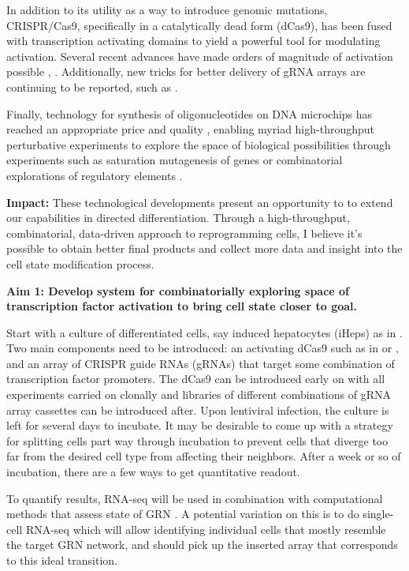 \documentclass[10pt]{article}
\begin{document}
In addition to its utility as a way to introduce genomic mutations, CRISPR/Cas9, specifically in a catalytically dead form (dCas9), has been fused with transcription activating domains to yield a powerful tool for modulating activation. Several recent advances have made orders of magnitude of activation possible \cite{chavez2015VPR}, \cite{konermann2014genome}. Additionally, new tricks for better delivery of gRNA arrays are continuing to be reported, such as \cite{xie2015boosting}.

Finally, technology for synthesis of oligonucleotides on DNA microchips has reached an appropriate price and quality \cite{leproust2010synthesis}, enabling myriad high-throughput perturbative experiments to explore the space of biological possibilities through experiments such as saturation mutagenesis of genes \cite{findlay2014saturation} or combinatorial explorations of regulatory elements \cite{kosuri2013composability}.
\newline

\textbf{Impact:} These technological developments present an opportunity to to extend our capabilities in directed differentiation. Through a high-throughput, combinatorial, data-driven approach to reprogramming cells, I believe it's possible to obtain better final products and collect more data and insight into the cell state modification process.
\newline

\textbf{Aim 1: Develop system for combinatorially exploring space of transcription factor activation to bring cell state closer to goal.}

Start with a culture of differentiated cells, say induced hepatocytes (iHeps) as in \cite{morris2014dissecting}. Two main components need to be introduced: an activating dCas9 such as in \cite{chavez2015VPR} or \cite{konermann2014genome}, and an array of CRISPR guide RNAs (gRNAs) that target some combination of transcription factor promoters. The dCas9 can be introduced early on with all experiments carried on clonally and libraries of different combinations of gRNA array cassettes can be introduced after. Upon lentiviral infection, the culture is left for several days to incubate. It may be desirable to come up with a strategy for splitting cells part way through incubation to prevent cells that diverge too far from the desired cell type from affecting their neighbors. After a week or so of incubation, there are a few ways to get quantitative readout.

To quantify results, RNA-seq will be used in combination with computational methods that assess state of GRN \cite{cahan2014cellnet}. A potential variation on this is to do single-cell RNA-seq which will allow identifying individual cells that mostly resemble the target GRN network, and should pick up the inserted array that corresponds to this ideal transition.
\newline
\end{document}
